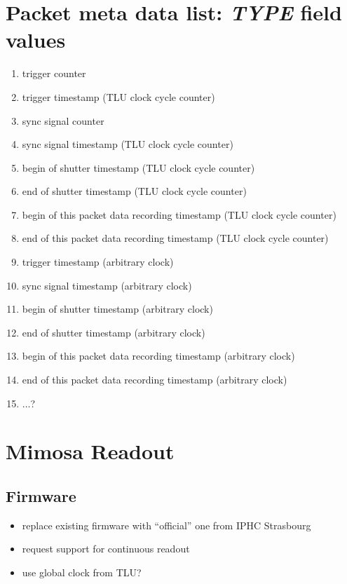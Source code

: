 \documentclass[paper=a4, fontsize=11pt]{scrartcl}	%
\numberwithin{equation}{section}		%
\numberwithin{figure}{section}			%
\numberwithin{table}{section}				%
\begin{document}
\section{Packet meta data list: \emph{TYPE} field values}
\label{app:typeid}
\begin{enumerate}
\item trigger counter
\item trigger timestamp (TLU clock cycle counter)
\item sync signal counter
\item sync signal timestamp (TLU clock cycle counter)
\item begin of shutter timestamp (TLU clock cycle counter)
\item end of shutter timestamp (TLU clock cycle counter)
\item begin of this packet data recording timestamp (TLU clock cycle counter)
\item end of this packet data recording timestamp (TLU clock cycle counter)
\item trigger timestamp (arbitrary clock)
\item sync signal timestamp (arbitrary clock)
\item begin of shutter timestamp (arbitrary clock)
\item end of shutter timestamp (arbitrary clock)
\item begin of this packet data recording timestamp (arbitrary clock)
\item end of this packet data recording timestamp (arbitrary clock)
\item $\ldots$?
\end{enumerate}

\section{Mimosa Readout}

\subsection{Firmware}
\label{sec:firmware}
\begin{itemize}
\item replace existing firmware with ``official'' one from IPHC Strasbourg
\item request support for continuous readout
\item use global clock from TLU?
\end{itemize}
\end{document}
